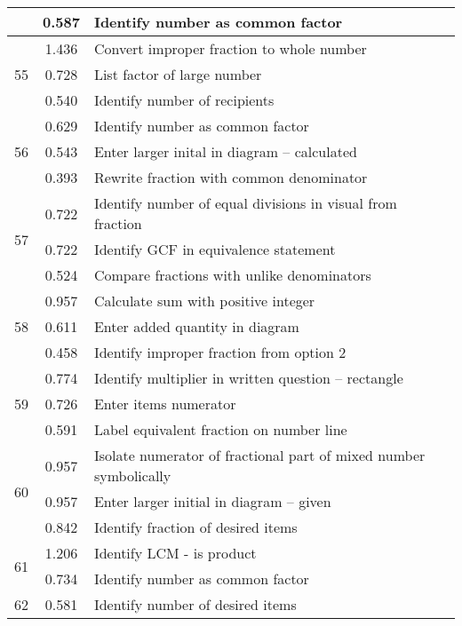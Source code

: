 \begin{longtable}[c]{|c|c|l|}
 & \small 0.587 & \small Identify number as common factor \\
\hline
\multirow{3}{*}{\small 55} & \small 1.436 & \small Convert improper fraction to whole number \\
 & \small 0.728 & \small List factor of large number \\
 & \small 0.540 & \small Identify number of recipients \\
\hline
\multirow{3}{*}{\small 56} & \small 0.629 & \small Identify number as common factor \\
 & \small 0.543 & \small Enter larger inital in diagram -- calculated \\
 & \small 0.393 & \small Rewrite fraction with common denominator \\
\hline
\multirow{3}{*}{\small 57} & \small 0.722 & \small Identify number of equal divisions in visual from fraction \\
 & \small 0.722 & \small Identify GCF in equivalence statement \\
 & \small 0.524 & \small Compare fractions with unlike denominators \\
\hline
\multirow{3}{*}{\small 58} & \small 0.957 & \small Calculate sum with positive integer \\
 & \small 0.611 & \small Enter added quantity in diagram \\
 & \small 0.458 & \small Identify improper fraction from option 2 \\
\hline
\multirow{3}{*}{\small 59} & \small 0.774 & \small Identify multiplier in written question -- rectangle \\
 & \small 0.726 & \small Enter items numerator \\
 & \small 0.591 & \small Label equivalent fraction on number line \\
\hline
\multirow{3}{*}{\small 60} & \small 0.957 & \small Isolate numerator of fractional part of mixed number symbolically \\
 & \small 0.957 & \small Enter larger initial in diagram -- given \\
 & \small 0.842 & \small Identify fraction of desired items \\
\hline
\multirow{2}{*}{\small 61} & \small 1.206 & \small Identify LCM - is product \\
 & \small 0.734 & \small Identify number as common factor \\
\hline
\multirow{3}{*}{\small 62} & \small 0.581 & \small Identify number of desired items \\

\end{longtable}
